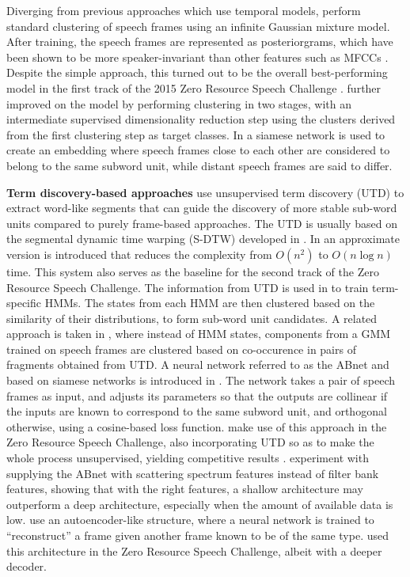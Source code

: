 Diverging from previous approaches which use temporal models, \textcite{chen2015parallel} perform standard clustering of speech frames using an infinite Gaussian mixture model.
After training, the speech frames are represented as posteriorgrams, which have been shown to be more speaker-invariant than other features such as MFCCs \parencite{zhang2010towards}.
Despite the simple approach, this turned out to be the overall best-performing model in the first track of the 2015 Zero Resource Speech Challenge \parencite{versteegh2016zero}.
\textcite{heck2016unsupervised} further improved on the model by performing clustering in two stages, with an intermediate supervised dimensionality reduction step using the clusters derived from the first clustering step as target classes.
In \parencite{synnaeve2016temporal} a siamese network \parencite{bromley1994signature} is used to create an embedding where speech frames close to each other are considered to belong to the same subword unit, while distant speech frames are said to differ.

\textbf{Term discovery-based approaches}
 use unsupervised term discovery (UTD) to extract word-like segments that can guide the discovery of more stable sub-word units compared to purely frame-based approaches.
The UTD is usually based on the segmental dynamic time warping (S-DTW) developed in \parencite{park2008unsupervised}.
In \parencite{jansen2011efficient} an approximate version is introduced that reduces the complexity from $O(n^2)$ to $O(n \log n)$ time.
This system also serves as the baseline for the second track of the Zero Resource Speech Challenge.
The information from UTD is used in \parencite{jansen2011towards} to train term-specific HMMs.
The states from each HMM are then clustered based on the similarity of their distributions, to form sub-word unit candidates.
A related approach is taken in \parencite{jansen2013weak}, where instead of HMM states, components from a GMM trained on speech frames are clustered based on co-occurence in pairs of fragments obtained from UTD.
A neural network referred to as the ABnet and based on siamese networks \parencite{bromley1994signature} is introduced in \parencite{synnaeve2014phonetics}.
The network takes a pair of speech frames as input, and adjusts its parameters so that the outputs are collinear if the inputs are known to correspond to the same subword unit, and orthogonal otherwise, using a cosine-based loss function.
\textcite{thiolliere2015hybrid} make use of this approach in the Zero Resource Speech Challenge, also incorporating UTD so as to make the whole process unsupervised, yielding competitive results \parencite{versteegh2016zero}.
\textcite{zeghidour2016deep} experiment with supplying the ABnet with scattering spectrum features instead of filter bank features, showing that with the right features, a shallow architecture may outperform a deep architecture, especially when the amount of available data is low.
\textcite{kamper2015unsupervised} use an autoencoder-like structure, where a neural network is trained to ``reconstruct'' a frame given another frame known to be of the same type.
\textcite{renshaw2015comparison} used this architecture in the Zero Resource Speech Challenge, albeit with a deeper decoder.

